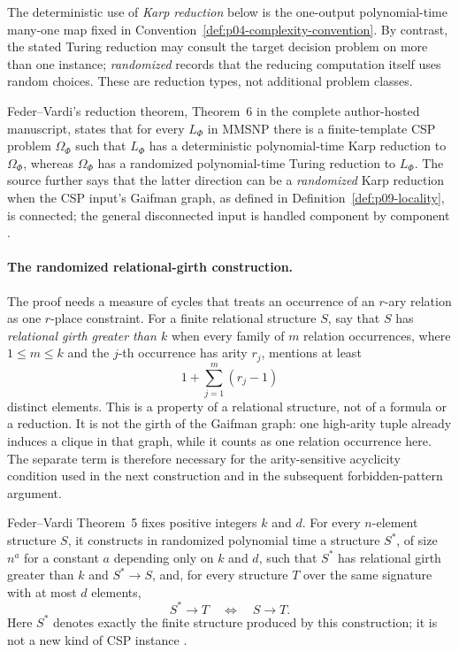 The deterministic use of \emph{Karp reduction} below is the one-output
polynomial-time many-one map fixed in
Convention~\ref{def:p04-complexity-convention}.  By contrast, the stated
Turing reduction may consult the target decision problem on more than one
instance; \emph{randomized} records that the reducing computation itself uses
random choices.  These are reduction types, not additional problem classes.

Feder--Vardi's reduction theorem, Theorem~6 in the complete author-hosted
manuscript, states that for every \(L_\Phi\) in MMSNP there is a
finite-template CSP problem \(\Omega_\Phi\) such that \(L_\Phi\) has a
deterministic polynomial-time Karp reduction to \(\Omega_\Phi\), whereas
\(\Omega_\Phi\) has a randomized polynomial-time Turing reduction to
\(L_\Phi\).  The source further says that the latter direction can be a
\emph{randomized} Karp reduction when the CSP input's Gaifman graph, as
defined in Definition~\ref{def:p09-locality}, is connected; the general
disconnected input is handled component by component
\cite[author-copy pp.~12--13, thm.~6]{FederVardi1998}.

\paragraph{The randomized relational-girth construction.}
The proof needs a measure of cycles that treats an occurrence of an
\(r\)-ary relation as one \(r\)-place constraint.  For a finite relational
structure \(S\), say that \(S\) has \emph{relational girth greater than
\(k\)} when every family of \(m\) relation occurrences, where
\(1\leq m\leq k\) and the \(j\)-th occurrence has arity \(r_j\),
mentions at least
\[
  1+\sum_{j=1}^{m}(r_j-1)
\]
distinct elements.  This is a property of a relational structure, not of a
formula or a reduction.  It is not the girth of the Gaifman graph: one
high-arity tuple already induces a clique in that graph, while it counts as
one relation occurrence here.  The separate term is therefore necessary for
the arity-sensitive acyclicity condition used in the next construction and in
the subsequent forbidden-pattern argument.

Feder--Vardi Theorem~5 fixes positive integers \(k\) and \(d\).  For every
\(n\)-element structure \(S\), it constructs in randomized polynomial time
a structure \(S^{\ast}\), of size \(n^a\) for a constant \(a\) depending
only on \(k\) and \(d\), such that \(S^{\ast}\) has relational girth
greater than \(k\) and \(S^{\ast}\to S\), and, for every structure \(T\)
over the same signature with at most
\(d\) elements,
\[
 S^{\ast}\to T \quad\Longleftrightarrow\quad S\to T.
\]
Here \(S^{\ast}\) denotes exactly the finite structure produced by this
construction; it is not a new kind of CSP instance
\cite[author-copy pp.~10--11, thm.~5]{FederVardi1998}.

